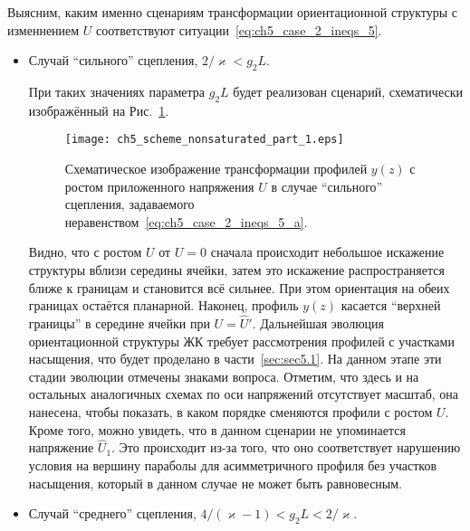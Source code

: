 Выясним, каким именно сценариям трансформации ориентационной структуры с изменнением $U$ соответствуют ситуации~\eqref{eq:ch5_case_2_ineqs_5}.
\begin{itemize}
	\item Случай ``сильного'' сцепления, $2/\varkappa < g_2 L$.
	
	При таких значениях параметра $g_2 L$ будет реализован сценарий, схематически изображённый на Рис.~\ref{fig:ch5_scheme_nonsaturated_part_1}.
	\begin{figure}[h]
		\centering
		\texttt{[image: ch5\_scheme\_nonsaturated\_part\_1.eps]}
		\caption{Схематическое изображение трансформации профилей $y(z)$ с ростом приложенного напряжения $U$ в случае ``сильного'' сцепления, задаваемого неравенством~\eqref{eq:ch5_case_2_ineqs_5_a}.}\label{fig:ch5_scheme_nonsaturated_part_1}
	\end{figure}
	Видно, что с ростом $U$ от $U = 0$ сначала происходит небольшое искажение структуры вблизи середины ячейки, затем это искажение распространяется ближе к границам и становится всё сильнее.
	При этом ориентация на обеих границах остаётся планарной.
	Наконец, профиль $y(z)$ касается ``верхней границы'' в середине ячейки при $U = \hat{U}'$.
	Дальнейшая эволюция ориентационной структуры ЖК требует рассмотрения профилей с участками насыщения, что будет проделано в части~\ref{sec:sec5.1}.
	На данном этапе эти стадии эволюции отмечены знаками вопроса.
	Отметим, что здесь и на остальных аналогичных схемах по оси напряжений отсутствует масштаб, она нанесена, чтобы показать, в каком порядке сменяются профили с ростом $U$.
	Кроме того, можно увидеть, что в данном сценарии не упоминается напряжение $\hat{U}_1$.
	Это происходит из-за того, что оно соответствует нарушению условия на вершину параболы для асимметричного профиля без участков насыщения, который в данном случае не может быть равновесным.

	\item Случай ``среднего'' сцепления, $4/(\varkappa - 1) < g_2 L < 2/\varkappa$.
	

\end{itemize}
